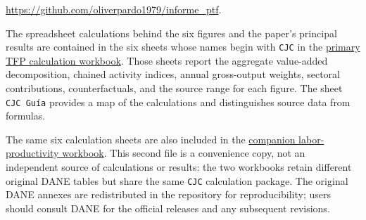\documentclass[12pt]{article}
\begin{document}
\url{https://github.com/oliverpardo1979/informe_ptf}.

\noindent The spreadsheet calculations behind the six figures and the paper's principal results are contained in the six sheets whose names begin with \texttt{CJC} in the
\href{https://github.com/oliverpardo1979/informe_ptf/blob/main/outputs/ptf_pesos_vbp_20260727_financieras/anex-PTF-Productividad-2025_con_calculos_CJC.xlsx}{primary TFP calculation workbook}.
Those sheets report the aggregate value-added decomposition, chained activity indices, annual gross-output weights, sectoral contributions, counterfactuals, and the source range for each figure. The sheet \texttt{CJC Gu\'ia} provides a map of the calculations and distinguishes source data from formulas.

\noindent The same six calculation sheets are also included in the
\href{https://github.com/oliverpardo1979/informe_ptf/blob/main/outputs/ptf_pesos_vbp_20260727_financieras/anex-PTF-ProductividadLaboral-2025_con_calculos_CJC.xlsx}{companion labor-productivity workbook}.
This second file is a convenience copy, not an independent source of calculations or results: the two workbooks retain different original DANE tables but share the same \texttt{CJC} calculation package. The original DANE annexes are redistributed in the repository for reproducibility; users should consult DANE for the official releases and any subsequent revisions.


\small

\end{document}
